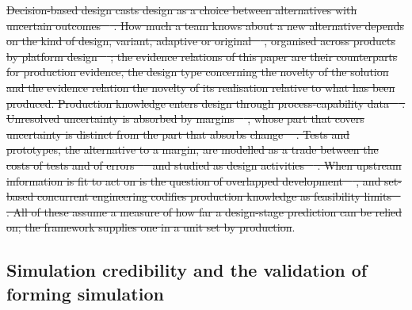 \documentclass[pdflatex,sn-basic,lineno]{sn-jnl}
\providecommand{\DIFadd}[1]{{\protect\color{blue}\uwave{#1}}} %
\providecommand{\DIFdel}[1]{{\protect\color{red}\sout{#1}}}                      %
\providecommand{\DIFaddbegin}{} %
\providecommand{\DIFaddend}{} %
\providecommand{\DIFdelbegin}{} %
\providecommand{\DIFdelend}{} %
\newcommand{\DIFscaledelfig}{0.5}
\newlength{\DIFdelgraphicswidth} %
\newlength{\DIFdelgraphicsheight} %
\newcommand{\DIFaddincludegraphics}[2][]{{\color{blue}\fbox{\DIFOincludegraphics[#1]{#2}}}} %
\newcommand{\DIFdelincludegraphics}[2][]{%
\sbox{\DIFdelgraphicsbox}{\DIFOincludegraphics[#1]{#2}}%
\settoboxwidth{\DIFdelgraphicswidth}{\DIFdelgraphicsbox} %
\settoboxtotalheight{\DIFdelgraphicsheight}{\DIFdelgraphicsbox} %
\scalebox{\DIFscaledelfig}{%
\parbox[b]{\DIFdelgraphicswidth}{\usebox{\DIFdelgraphicsbox}\\[-\baselineskip] \rule{\DIFdelgraphicswidth}{0em}}\llap{\resizebox{\DIFdelgraphicswidth}{\DIFdelgraphicsheight}{%
\setlength{\unitlength}{\DIFdelgraphicswidth}%
\begin{picture}(1,1)%
\thicklines\linethickness{2pt} %
{\color[rgb]{1,0,0}\put(0,0){\framebox(1,1){}}}%
{\color[rgb]{1,0,0}\put(0,0){\line( 1,1){1}}}%
{\color[rgb]{1,0,0}\put(0,1){\line(1,-1){1}}}%
\end{picture}%
}\hspace*{3pt}}} %
} %
\DeclareRobustCommand{\DIFaddbegin}{\DIFOaddbegin \let\includegraphics\DIFaddincludegraphics} %
\DeclareRobustCommand{\DIFaddend}{\DIFOaddend \let\includegraphics\DIFOincludegraphics} %
\DeclareRobustCommand{\DIFdelbegin}{\DIFOdelbegin \let\includegraphics\DIFdelincludegraphics} %
\DeclareRobustCommand{\DIFdelend}{\DIFOaddend \let\includegraphics\DIFOincludegraphics} %
\begin{document}
\DIFdel{Decision-based design casts design as a choice between alternatives with uncertain outcomes \mbox{%
\citep{hazelrigg1998framework}}\hskip0pt%
. How much a team knows about a new alternative depends on the kind of design, variant, adaptive or original \mbox{%
\citep{pahl2007engineering}}\hskip0pt%
, organised across products by platform design \mbox{%
\citep{simpson2006product}}\hskip0pt%
; the evidence relations of this paper are their counterparts for production evidence, the design type concerning the novelty of the solution and the evidence relation the novelty of its realisation relative to what has been produced. Production knowledge enters design through process-capability data \mbox{%
\citep{thornton2004variation, tata1999process}}\hskip0pt%
. Unresolved uncertainty is absorbed by margins \mbox{%
\citep{eckert2019design}}\hskip0pt%
, whose part that covers uncertainty is distinct from the part that absorbs change \mbox{%
\citep{eckert2017safety}}\hskip0pt%
. Tests and prototypes, the alternative to a margin, are modelled as a trade between the costs of tests and of errors \mbox{%
\citep{thomke1998simulation, thomke2001sequential, salado2018mathematical} }\hskip0pt%
and studied as design activities \mbox{%
\citep{tahera2019testing}}\hskip0pt%
. When upstream information is fit to act on is the question of overlapped development \mbox{%
\citep{krishnan1997model, terwiesch2002exchanging}}\hskip0pt%
, and set-based concurrent engineering codifies production knowledge as feasibility limits \mbox{%
\citep{sobek1999toyota}}\hskip0pt%
. All of these assume a measure of how far a design-stage prediction can be relied on; the framework supplies one in a unit set by production}\DIFdelend \DIFaddbegin \DIFadd{judge}\DIFaddend .

\DIFdelbegin %
\DIFdelend \DIFaddbegin \subsection{Simulation credibility and the validation of forming simulation}
\DIFaddend 
\end{document}
